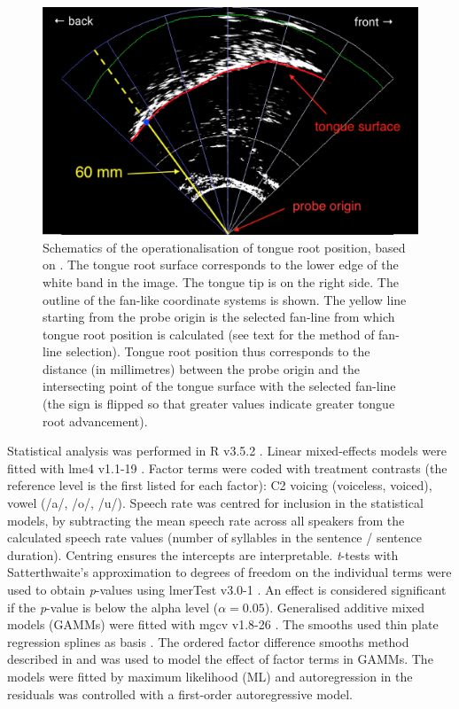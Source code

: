 \documentclass[preprint]{JASAnew}
\begin{document}
\begin{figure}
  \centering
  \includegraphics[width=5in]{Figure1.png}
  \caption{Schematics of the operationalisation of tongue root position, based on \citet{kirkham2017}. The tongue root surface corresponds to the lower edge of the white band in the image. The tongue tip is on the right side. The outline of the fan-like coordinate systems is shown. The yellow line starting from the probe origin is the selected fan-line from which tongue root position is calculated (see text for the method of fan-line selection). Tongue root position thus corresponds to the distance (in millimetres) between the probe origin and the intersecting point of the tongue surface with the selected fan-line (the sign is flipped so that greater values indicate greater tongue root advancement).}
  \label{f:trp}
\end{figure}

Statistical analysis was performed in R v3.5.2 \citep{r-core-team2018}.
Linear mixed-effects models were fitted with lme4 v1.1-19
\citep{bates2015}. Factor terms were coded with treatment contrasts (the
reference level is the first listed for each factor): C2 voicing
(voiceless, voiced), vowel (/a/, /o/, /u/). Speech rate was centred for
inclusion in the statistical models, by subtracting the mean speech rate
across all speakers from the calculated speech rate values (number of
syllables in the sentence / sentence duration). Centring ensures the
intercepts are interpretable. \emph{t}-tests with Satterthwaite's
approximation to degrees of freedom on the individual terms were used to
obtain \emph{p}-values using lmerTest v3.0-1
\citep{kuznetsova2017, luke2017}. An effect is considered significant if
the \emph{p}-value is below the alpha level (\(\alpha = 0.05\)).
Generalised additive mixed models (GAMMs) were fitted with mgcv v1.8-26
\citep{wood2011, wood2017}. The smooths used thin plate regression
splines as basis \citep{wood2003}. The ordered factor difference smooths
method described in \citet{soskuthy2017} and \citet{wieling2018} was
used to model the effect of factor terms in GAMMs. The models were
fitted by maximum likelihood (ML) and autoregression in the residuals
was controlled with a first-order autoregressive model.
\end{document}
